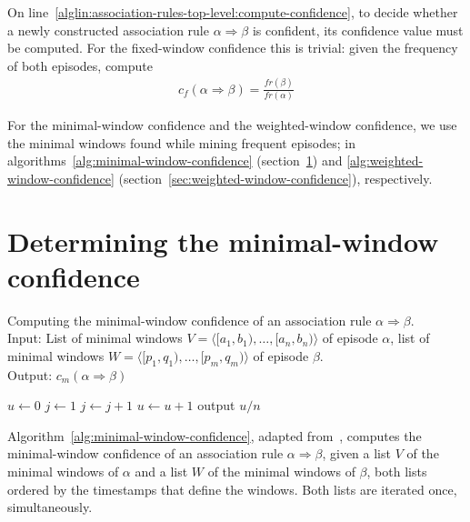 On line~\ref{alglin:association-rules-top-level:compute-confidence}, to decide whether a newly constructed association rule $ \alpha \Rightarrow \beta $ is confident, its confidence value must be computed. For the fixed-window confidence this is trivial: given the frequency of both episodes, compute
\begin{align*}
c_f(\alpha \Rightarrow \beta) = \frac{fr(\beta)}{fr(\alpha)}
\end{align*}

For the minimal-window confidence and the weighted-window confidence, we use the minimal windows found while mining frequent episodes; in algorithms~\ref{alg:minimal-window-confidence} (section~\ref{sec:minimal-window-confidence}) and \ref{alg:weighted-window-confidence} (section~\ref{sec:weighted-window-confidence}), respectively.

\section{Determining the minimal-window confidence}
\label{sec:minimal-window-confidence}

\begin{algorithm}

\caption{Computing the minimal-window confidence of an association rule $ \alpha \Rightarrow \beta $.\\
Input: List of minimal windows $ V = \langle [a_1, b_1), \ldots, [a_n, b_n) \rangle $ of episode $ \alpha $, list of minimal windows $ W = \langle [p_1, q_1), \ldots, [p_m, q_m) \rangle $ of episode $ \beta $.\\
Output: $ c_m(\alpha \Rightarrow \beta) $
}

\begin{algorithmic}[1]

\State $ u \gets 0 $
\State $ j \gets 1 $
 \label{alglin:minimal-window-confidence:for}
     \label{alglin:minimal-window-confidence:while}
        \State $ j \gets j + 1 $
    \EndWhile
     $ u \gets u + 1 $ \label{alglin:minimal-window-confidence:increment}
    \EndIf
\EndFor
\State output $ u / n $

\end{algorithmic}

\label{alg:minimal-window-confidence}
\end{algorithm}

Algorithm~\ref{alg:minimal-window-confidence}, adapted from~\citep{cule2014marbles}, computes the minimal-window confidence of an association rule $ \alpha \Rightarrow \beta $, given a list $ V $ of the minimal windows of $ \alpha $ and a list $ W $ of the minimal windows of $ \beta $, both lists ordered by the timestamps that define the windows. Both lists are iterated once, simultaneously.

